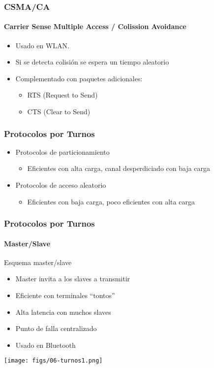 \documentclass[letter]{beamer}
\begin{document}
\begin{frame}
  \frametitle{CSMA/CA}
  \framesubtitle{Carrier Sense Multiple Access / Colission Avoidance}

  \begin{itemize}
    \item Usado en WLAN.
    \item Si se detecta colisión se espera un tiempo aleatorio
    \item Complementado con paquetes adicionales:
      \begin{itemize}
        \item RTS (Request to Send)
        \item CTS (Clear to Send)
      \end{itemize}
  \end{itemize}

\end{frame}
\begin{frame}
  \frametitle{Protocolos por Turnos}

  \begin{itemize}
    \item Protocolos de particionamiento
      \begin{itemize}
        \item Eficientes con alta carga, canal desperdiciado con baja carga
      \end{itemize}
    \item Protocolos de acceso aleatorio
      \begin{itemize}
        \item Eficientes con baja carga, poco eficientes con alta carga
      \end{itemize}
  \end{itemize}
\end{frame}

\begin{frame}
  \frametitle{Protocolos por Turnos}
  \framesubtitle{Master/Slave}
  
  Esquema master/slave
    \begin{itemize}
      \item Master invita a los slaves a transmitir
      \item Eficiente con terminales ``tontos''
      \item Alta latencia con muchos slaves
      \item Punto de falla centralizado
      \item Usado en Bluetooth
    \end{itemize}
  
  \begin{center}
    \texttt{[image: figs/06-turnos1.png]}
  \end{center}

\end{frame}
\end{document}
